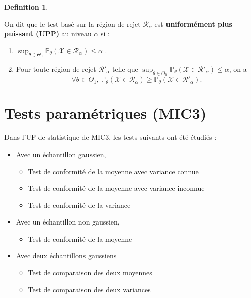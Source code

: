 \documentclass[
]{book}
\providecommand{\tightlist}{%
  \setlength{\itemsep}{0pt}\setlength{\parskip}{0pt}}
\theoremstyle{definition}
\newtheorem{definition}{Definition}[chapter]
\theoremstyle{definition}
\theoremstyle{definition}
\theoremstyle{definition}
\theoremstyle{remark}
\begin{document}
\begin{definition}
\protect\hypertarget{def:unlabeled-div-9}{}\label{def:unlabeled-div-9}

On dit que le test basé sur la région de rejet \(\mathcal R_{\alpha}\) est \textbf{uniformément plus puissant (UPP)} au niveau \(\alpha\) si :

\begin{enumerate}
\def\labelenumi{\arabic{enumi}.}
\tightlist
\item
  \(\sup_{\theta \in \Theta_0}\mathbb{P}_{\theta}(\mathcal{X}\in \mathcal R_{\alpha})\leq \alpha\) .
\item
  Pour toute région de rejet \(\mathcal R'_{\alpha}\) telle que \(\sup_{\theta \in \Theta_0}\mathbb{P}_{\theta}(\mathcal{X}\in \mathcal R'_{\alpha})\leq \alpha\), on a
  \[ \forall \theta \in \Theta_1, \ \mathbb{P}_{\theta}(\mathcal{X}\in \mathcal R_{\alpha}) \geq \mathbb{P}_{\theta}(\mathcal{X}\in \mathcal R'_{\alpha}).\]
\end{enumerate}

\end{definition}

\hypertarget{tests-paramuxe9triques-mic3}{%
\section{Tests paramétriques (MIC3)}\label{tests-paramuxe9triques-mic3}}

Dans l'UF de statistique de MIC3, les tests suivants ont été étudiés :

\begin{itemize}
\tightlist
\item
  Avec un échantillon gaussien,

  \begin{itemize}
  \tightlist
  \item
    Test de conformité de la moyenne avec variance connue
  \item
    Test de conformité de la moyenne avec variance inconnue
  \item
    Test de conformité de la variance
  \end{itemize}
\item
  Avec un échantillon non gaussien,

  \begin{itemize}
  \tightlist
  \item
    Test de conformité de la moyenne
  \end{itemize}
\item
  Avec deux échantillons gaussiens

  \begin{itemize}
  \tightlist
  \item
    Test de comparaison des deux moyennes
  \item
    Test de comparaison des deux variances
  \end{itemize}
\end{itemize}
\end{document}
